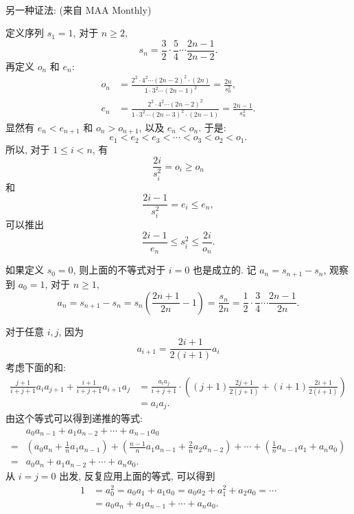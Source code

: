 ~

\noindent 另一种证法: (来自 MAA Monthly)

定义序列 $ s_1= 1 $, 对于 $ n \ge 2 $, \[ s_n = \frac{3}{2}\cdot\frac{5}{4}\cdots\frac{2n-1}{2n-2} .\]
再定义 $ o_n $ 和 $ e_n $: 
\begin{align*}
o_n &= \frac{2^2\cdot 4^2\cdots (2n-2)^2\cdot (2n)}{1\cdot 3^2\cdots (2n-1)^2} = \frac{2n}{s_n^2} ,\\
e_n &= \frac{2^2\cdot 4^2\cdots (2n-2)^2}{1\cdot 3^2\cdots (2n-3)^2\cdot (2n-1)} = \frac{2n-1}{s_n^2} .
\end{align*}
显然有 $ e_n < e_{n+1} $ 和 $ o_n > o_{n+1} $, 以及 $ e_n < o_n $. 于是:
\[ e_1 < e_2 < e_3 < \cdots < o_3 < o_2 < o_1 .\]
所以, 对于 $ 1\le i < n $, 有 \[ \frac{2i}{s_i^2}=o_i\ge o_n \] 和 \[ \frac{2i-1}{s_i^2}=e_i\le e_n ,\]
可以推出 \[ \frac{2i-1}{e_n}\le s_i^2\le \frac{2i}{o_n} .\]

如果定义 $ s_0 = 0 $, 则上面的不等式对于 $ i = 0 $ 也是成立的.  记 $ a_n = s_{n+1} - s_n $, 观察到 $ a_0 = 1 $, 对于 $ n \ge 1 $, 
\[ a_n = s_{n+1}-s_n = s_n\left(\frac{2n+1}{2n} - 1 \right) = \frac{s_n}{2n} = \frac{1}{2}\cdot\frac{3}{4}\cdots\frac{2n-1}{2n} .\]

对于任意 $ i, j $, 因为 \[ a_{i+1} = \frac{2i+1}{2(i+1)}a_i \]
考虑下面的和:
\begin{align*}
\frac{j+1}{i+j+1}a_i a_{j+1} + \frac{i+1}{i+j+1}a_{i+1}a_j &= \frac{a_i a_j}{i+j+1}\cdot\left((j+1)\frac{2j+1}{2(j+1)} + (i+1)\frac{2i+1}{2(i+1)}\right) \\
 &= a_i a_j.
\end{align*}
由这个等式可以得到递推的等式: 
\begin{align*} 
 & a_0a_{n-1}+a_1a_{n-2}+\cdots+a_{n-1}a_0 \\
= &\left(a_0a_n+\frac{1}{n}a_1a_{n-1}\right)+\left(\frac{n-1}{n}a_1a_{n-1}+\frac{2}{n}a_2a_{n-2}\right)+\cdots+\left(\frac{1}{n}a_{n-1}a_1+a_na_0\right) \\
 = & a_0a_n + a_1a_{n-2} + \cdots + a_na_0 . 
\end{align*}
从 $ i = j = 0 $ 出发, 反复应用上面的等式, 可以得到 
\begin{align*}
1 &= a_0^2 = a_0a_1 + a_1a_0 = a_0a_2+a_1^2+a_2a_0 = \cdots \\
  &= a_0a_n + a_1a_{n-1} + \cdots + a_na_0 .
\end{align*}

